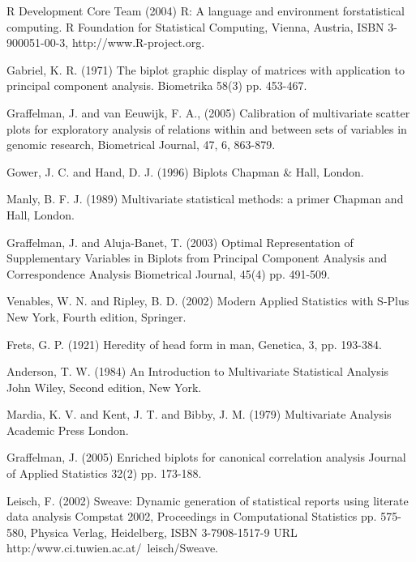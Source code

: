 \documentclass[a4paper]{article}
\begin{document}

\begin{thebibliography}{10}

R Development Core Team 
(2004) 
R: A language and environment forstatistical computing.
R Foundation for Statistical Computing,
Vienna, Austria,
ISBN 3-900051-00-3,
http://www.R-project.org.

Gabriel, K. R. 
(1971)
The biplot graphic display of matrices with application to principal component analysis.
Biometrika 
58(3) 
pp. 453-467.

Graffelman, J. and van Eeuwijk, F. A.,
(2005)
Calibration of multivariate scatter plots for exploratory analysis of relations within and between sets of variables 
in genomic research,
Biometrical Journal,
47,
6,
863-879.

Gower, J. C. and Hand, D. J.
(1996)
Biplots
Chapman \& Hall,
London.

Manly, B. F. J.
(1989)
Multivariate statistical methods: a primer
Chapman and Hall, London.

Graffelman, J. and Aluja-Banet, T.
(2003)
Optimal Representation of Supplementary Variables in Biplots from Principal Component Analysis and Correspondence Analysis
Biometrical Journal,
45(4)
pp. 491-509.

Venables, W. N. and Ripley, B. D.
(2002)
{M}odern {A}pplied {S}tatistics with {S}-{P}lus
New York,
Fourth edition,
Springer.

Frets, G. P.
(1921)
Heredity of head form in man,
Genetica,
3, 
pp. 193-384.

Anderson, T. W.
(1984)
{A}n {I}ntroduction to {M}ultivariate {S}tatistical {A}nalysis
John Wiley,
Second edition,
New York.

Mardia, K. V. and Kent, J. T. and Bibby, J. M.
(1979)
Multivariate Analysis
Academic Press London.


Graffelman, J.
(2005)
Enriched biplots for canonical correlation analysis
Journal of Applied Statistics
32(2)
pp. 173-188.


Leisch, F.
(2002)
Sweave: Dynamic generation of statistical reports using literate data analysis
Compstat 2002, Proceedings in Computational Statistics
pp. 575-580,
Physica Verlag, Heidelberg,
ISBN 3-7908-1517-9
URL http:/www.ci.tuwien.ac.at/~leisch/Sweave.

\end{thebibliography}
\end{document}
